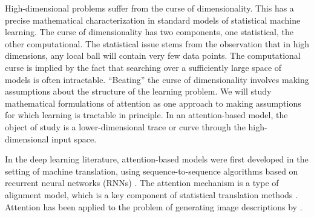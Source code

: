 
\statbackground{} High-dimensional problems suffer from the curse of
dimensionality. This has a precise mathematical characterization in
standard models of statistical machine learning. The curse of
dimensionality has two components, one statistical, the other
computational. The statistical issue stems from the observation that
in high dimensions, any local ball will contain very few data
points. The computational curse is implied by the fact that searching
over a sufficiently large space of models is often
intractable. ``Beating'' the curse of dimensionality involves making
assumptions about the structure of the learning problem. We will study
mathematical formulations of attention as one approach to making
assumptions for which learning is tractable in principle.
In an attention-based model, the object of study is a
lower-dimensional trace or curve through the high-dimensional input
space. 

In the deep learning literature, attention-based models were first
developed in the setting of machine translation, using
sequence-to-sequence algorithms based on recurrent neural networks
(RNNs) \citep{bahdanau2014}. The attention mechanism is a type of alignment model,
which is a key component of statistical translation methods
\citep{Brown1993}. Attention has been applied to the problem of generating image
descriptions by \cite{showtell}.

